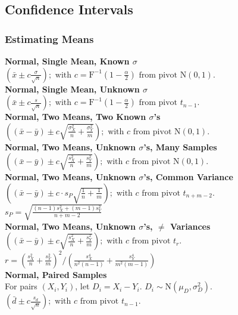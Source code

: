 \documentclass{article}
\begin{document}
\begin{multicols*}{2}
\subsection*{Confidence Intervals}
{\color{magenta}\subsubsection*{Estimating Means}}
\textbf{Normal, Single Mean, Known $\sigma$}\\
$ \left( \bar{x} \pm c \frac{\sigma}{\sqrt{n}} \right) ; \mbox{ with } c=\mbox{F}^{-1}(1-\frac{\alpha}{2}) \mbox{ from pivot } \mbox{N}(0, 1).$\\
\textbf{Normal, Single Mean, Unknown $\sigma$}\\
$ \left( \bar{x} \pm c \frac{s}{\sqrt{n}} \right); \mbox{ with } c=\mbox{F}^{-1}(1-\frac{\alpha}{2}) \mbox{ from pivot } t_{n-1}.$\\
\textbf{Normal, Two Means, Two Known $\sigma$'s}\\
$ \left( (\bar{x} - \bar{y}) \pm c \sqrt{\frac{\sigma_{X}^{2}}{n} + \frac{\sigma_{Y}^{2}}{m}} \right); \mbox{ with } c \mbox{ from pivot } \mbox{N}(0, 1).$\\
\textbf{Normal, Two Means, Unknown $\sigma$'s, Many Samples}\\
$ \left( (\bar{x} - \bar{y}) \pm c \sqrt{\frac{s_{X}^{2}}{n} + \frac{s_{Y}^{2}}{m}} \right); \mbox{ with } c \mbox{ from pivot } \mbox{N}(0, 1).$\\
\textbf{Normal, Two Means, Unknown $\sigma$'s, Common Variance}\\
$ \left( (\bar{x} - \bar{y}) \pm c \cdot s_{P} \sqrt{\frac{1}{n} + \frac{1}{m}} \right); \mbox{ with } c \mbox{ from pivot } t_{n+m-2}.$\\
\-\hspace{2cm} $ s_{P} = \sqrt{\frac{(n-1) s^{2}_{X} + (m-1) s^{2}_{Y}}{n+m-2}} $\\
\textbf{Normal, Two Means, Unknown $\sigma$'s, $\neq$ Variances}\\  %
$ \left( (\bar{x} - \bar{y}) \pm c \sqrt{\frac{s_{X}^{2}}{n} + \frac{s_{Y}^{2}}{m}} \right); \mbox{ with } c \mbox{ from pivot } t_{r}.$\\
\-\hspace{1cm} $ r = \left( \frac{s_{X}^{2}}{n} + \frac{s_{Y}^{2}}{m} \right)^2 / \left( \frac{s_{X}^{4}}{n^{2}(n-1)} + \frac{s_{Y}^{4}}{m^{2}(m-1)} \right) $\\
\textbf{Normal, Paired Samples}\\
For pairs $(X_{i}, Y_{i})$, let $D_{i} = X_{i} - Y_{i}$. $D_{i} \sim \mbox{N}(\mu_{D}, \sigma_{D}^{2}).$\\
$ \left( \bar{d} \pm c \frac{s_{d}}{\sqrt{n}} \right); \mbox{ with } c \mbox{ from pivot } t_{n-1}.$ 


\end{multicols*}
\end{document}
